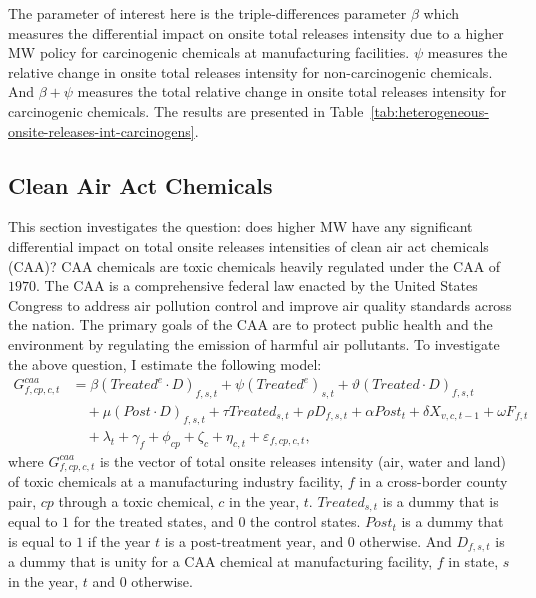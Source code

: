 \documentclass[12pt, english]{article}
\begin{document}
    The parameter of interest here is the triple-differences parameter $\beta$ which measures the differential impact on onsite total releases intensity due to a higher MW policy for carcinogenic chemicals at manufacturing facilities. $\psi$ measures the relative change in onsite total releases intensity for non-carcinogenic chemicals. And $\beta + \psi$ measures the total relative change in onsite total releases intensity for carcinogenic chemicals. The results are presented in Table~\ref{tab:heterogeneous-onsite-releases-int-carcinogens}.
    

    \subsection{Clean Air Act Chemicals}\label{subsec:clean-air-act-chemicals}
    This section investigates the question: does higher MW have any significant differential impact on total onsite releases intensities of clean air act chemicals (CAA)? CAA chemicals are toxic chemicals heavily regulated under the CAA of $1970$. The CAA is a comprehensive federal law enacted by the United States Congress to address air pollution control and improve air quality standards across the nation. The primary goals of the CAA are to protect public health and the environment by regulating the emission of harmful air pollutants. To investigate the above question, I estimate the following model:
    \begin{align}
        G_{f,cp,c,t}^{caa} &= \beta (Treated^{e} \cdot D)_{f,s,t} + \psi (Treated^{e})_{s,t} + \vartheta (Treated \cdot D)_{f,s,t} \nonumber \\
        &\quad + \mu (Post \cdot D)_{f,s,t} + \tau Treated_{s,t} + \rho D_{f,s,t} + \alpha Post_{t} + \delta X_{v,c,t-1} + \omega F_{f,t} \nonumber \\
        &\quad + \lambda_{t} + \gamma_{f} + \phi_{cp} + \zeta_{c} + \eta_{c,t} + \varepsilon_{f,cp,c,t},\label{eq:heterogeneous-onsite-releases-intensity-caa}
    \end{align}
    where $G_{f,cp,c,t}^{caa}$ is the vector of total onsite releases intensity (air, water and land) of toxic chemicals at a manufacturing industry facility, $f$ in a cross-border county pair, $cp$ through a toxic chemical, $c$ in the year, $t$. $Treated_{s,t}$ is a dummy that is equal to $1$ for the treated states, and $0$ the control states. $Post_{t}$ is a dummy that is equal to $1$ if the year $t$ is a post-treatment year, and $0$ otherwise. And $D_{f,s,t}$ is a dummy that is unity for a CAA chemical at manufacturing facility, $f$ in state, $s$ in the year, $t$ and $0$ otherwise.
    
\end{document}
